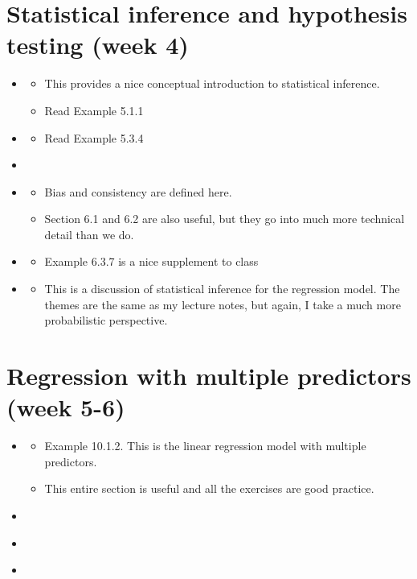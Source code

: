 \section*{Statistical inference and hypothesis testing (week 4)}
\begin{itemize}
\item \cite[Section 5.1]{tabak}
\begin{itemize}
\item This provides a nice conceptual introduction to statistical inference. 
\item Read Example 5.1.1
\end{itemize} 
\item \cite[Section 5.3]{tabak}
\begin{itemize}
\item Read Example 5.3.4
\end{itemize}
\item \cite[Section 4.4.2]{tabak}
\item \cite[Section 6.3.1]{tabak}
\begin{itemize}
\item Bias and consistency are defined here. 
\item Section 6.1 and 6.2 are also useful, but they go into much more technical detail than we do. 
\end{itemize}
\item \cite[Section 6.3.1]{tabak}
\begin{itemize}
\item Example 6.3.7 is a nice supplement to class
\end{itemize}
\item \cite[Section 3.1.2]{islp}
\begin{itemize}
\item This is a discussion of statistical inference for the regression model. The themes are the same as my lecture notes, but again, I take a much more probabilistic perspective. 
\end{itemize}
\end{itemize}
\section*{Regression with multiple predictors (week 5-6)}
\begin{itemize}
\item  \cite[Section 10.1]{islp}
\begin{itemize}
\item Example 10.1.2. This is the linear regression model with multiple predictors. 
\item This entire section is useful and all the exercises are good practice. 
\end{itemize}
\item \cite[Section 10.2]{tabak}
\item \cite[Section 10.5]{tabak}
\item \cite[Section 3.2]{islp}
\end{itemize}
